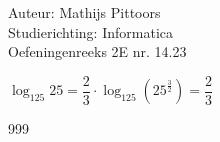 \documentclass[a4paper]{article}
\begin{document}
  
\noindent \large Auteur: Mathijs Pittoors \\
\noindent \large Studierichting: Informatica\\
\noindent \large Oefeningenreeks 2E nr. 14.23\\

\medskip

\normalsize

$\log_{125} 25 = \dfrac{2}{3} \cdot \log_{125}\left( 25^{\tfrac{3}{2}}\right) = \dfrac{2}{3}$

\begin{thebibliography}{999}
\end{thebibliography}
\end{document}
